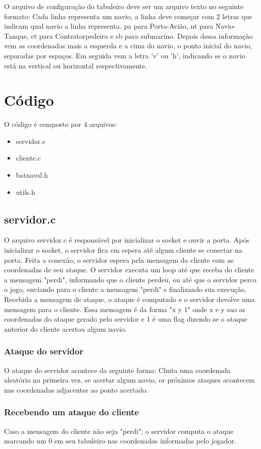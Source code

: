 \documentclass[11pt]{article}
\begin{document}
O arquivo de configuração do tabuleiro deve ser um arquivo texto no seguinte formato:
Cada linha representa um navio, a linha deve começar com 2 letras que indicam qual navio a linha representa. pa para Porta-Avião, nt para Navio-Tanque, ct para Contratorpedeiro e sb para submarino. Depois dessa informação vem as coordenadas mais a esquerda e a cima do navio, o ponto inicial do navio, separadas por espaços. Em seguida vem a letra 'v' ou 'h', indicando se o navio está na vertical ou horizontal respectivamente. 

\section{Código}
O código é composto por 4 arquivos:
\begin{itemize}
\item servidor.c
\item cliente.c
\item batnaval.h
\item utils.h
\end{itemize}

\subsection{servidor.c}
O arquivo servidor.c é responsável por inicializar o socket e ouvir a porta.
Após inicializar o socket, o servidor fica em espera até algum cliente se conectar na porta.
Feita a conexão, o servidor espera pela mensagem do cliente com as coordenadas de seu ataque.
O servidor executa um loop até que receba do cliente a mensagem "perdi", informando que o cliente perdeu, ou até que o servidor perca o jogo, enviando para o cliente a mensagem "perdi" e finalizando sua execução.
Recebida a mensagem de ataque, o ataque é computado e o servidor devolve uma mensagem para o cliente.
Essa mensagem é da forma "x y 1" onde x e y sao as coordenadas do ataque gerado pelo servidor e 1 é uma flag
dizendo se o ataque anterior do cliente acertou algum navio.
\subsubsection{Ataque do servidor}
O ataque do servidor acontece da seguinte forma: Chuta uma coordenada aleatória na primeira vez, se acertar algum navio, or próximos ataques acontecem nas coordenadas adjacentes ao ponto acertado.
\subsubsection{Recebendo um ataque do cliente}
Caso a mensagem do cliente não seja "perdi", o servidor computa o ataque marcando um 0 em seu tabuleiro nas coordenadas informadas pelo jogador.
\end{document}
